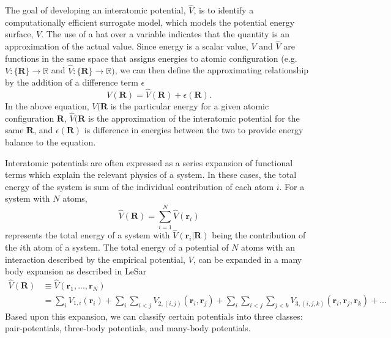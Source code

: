 The goal of developing an interatomic potential, $\hat{V}$, is to identify a computationally efficient surrogate model, which models the potential energy surface, $V$.  The use of a hat over a variable indicates that the quantity is an approximation of the actual value.
Since energy is a scalar value, $V$ and $\hat{V}$ are functions in the same space that assigns energies to atomic configuration (e.g. ${V:\{\bm{R}\}\rightarrow \mathbb{R}}$ and ${\hat{V}:\{\bm{R}\} \rightarrow \mathbb{R}})$, we can then define the approximating relationship by the addition of a difference term $\epsilon$
\begin{equation}\label{eq:pes_approximation}
    V(\bm{R}) = \hat{V}(\bm{R}) + \epsilon(\bm{R}).
\end{equation}
In the above equation, $V(\bm{R}$ is the particular energy for a given atomic configuration $\bm{R}$, $\hat{V}(\bm{R}$ is the approximation of the interatomic potential for the same ${\bm{R}}$, and $\epsilon(\bm{R})$ is difference in energies between the two to provide energy balance to the equation.

Interatomic potentials are often expressed as a series expansion of functional terms which explain the relevant physics of a system.  In these cases, the total energy of the system is sum of the individual contribution of each atom $i$.  For a system with $N$ atoms,
\begin{equation}
	\label{eq:potential_energy}
	\hat{V}(\bm{R})= \sum_{i=1}^{N} \hat{V}(\bm{r}_i)
\end{equation}
represents the total energy of a system with $\hat{V}(\bm{r}_i \vert \bm{R})$ being the contribution of the $i$th atom of  a system.
The total energy of a potential of $N$ atoms with an interaction described by the empirical potential, $V$, can be expanded in a many body expansion as described in LeSar\cite{lesar2013_textbook}
\begin{align}
\label{eq:potential_expansion}
	\hat{V}(\bm{R}) &\equiv \hat{V}(\bm{r}_1,...,\bm{r}_N) \\
	          &= \sum_i V_{1,i} (\bm{r}_i)
	             + \sum_i \sum_{i<j} V_{2,(i,j)}(\bm{r}_i,\bm{r}_j)
		     + \sum_i \sum_{i<j} \sum_{j<k} V_{3,(i,j,k)}(\bm{r}_i,\bm{r}_j,\bm{r}_k)
		     + ...
\end{align}
Based upon this expansion, we can classify certain potentials into three classes: pair-potentials, three-body potentials, and many-body potentials.

